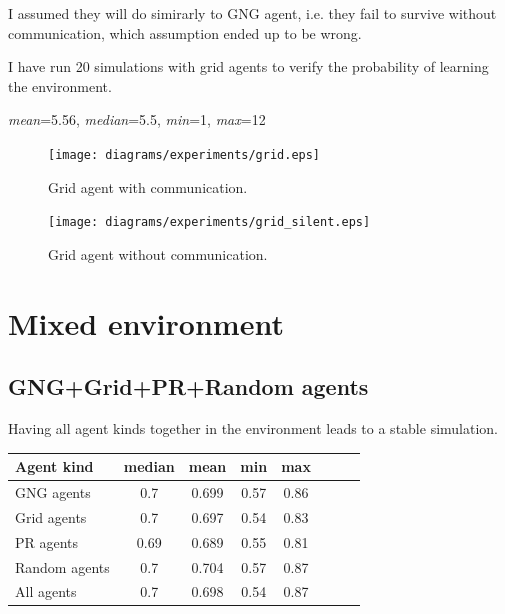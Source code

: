I assumed they will do simirarly to GNG agent, i.e. they fail to survive without communication, which assumption ended up to be wrong. 

I have run 20 simulations with grid agents to verify the probability of learning the environment.


\begin{center}   
  \emph{mean}=5.56, \emph{median}=5.5, \emph{min}=1, \emph{max}=12                 
\end{center}

\begin{figure}
  \centering                                
  \texttt{[image: diagrams/experiments/grid.eps]}    
  \caption{Grid agent with communication.}
  \label{experiments:gng}
\end{figure} 

\begin{figure}
  \centering                                
  \texttt{[image: diagrams/experiments/grid\_silent.eps]}    
  \caption{Grid agent without communication.}
  \label{experiments:gng-silent}
\end{figure} 

\section{Mixed environment}
                                                                                
\subsection{GNG+Grid+PR+Random agents}

Having all agent kinds together in the environment leads to a stable simulation.
            
\begin{center}   
  \begin{tabular}{l*{6}{c}r}
  Agent kind        & median & mean & min & max \\
  \hline
  GNG agents        & 0.7 & 0.699 & 0.57 & 0.86  \\
  Grid agents       & 0.7 & 0.697 & 0.54 & 0.83  \\   
  PR agents         & 0.69 & 0.689 & 0.55 & 0.81 \\  
  Random agents     & 0.7 & 0.704 & 0.57 & 0.87  \\
  All agents        & 0.7 & 0.698 & 0.54 & 0.87  \\ 
  \end{tabular}                  
\end{center}
 
